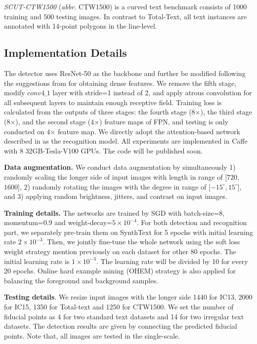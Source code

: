 \documentclass[letterpaper]{article} \usepackage{aaai20}  \usepackage{times}  \usepackage{helvet} \usepackage{courier}  \usepackage[hyphens]{url}  \usepackage{graphicx} \urlstyle{rm} \def\UrlFont{\rm}  \usepackage{graphicx}  \frenchspacing  \setlength{\pdfpagewidth}{8.5in}  \setlength{\pdfpageheight}{11in}  \usepackage{amsmath}
\begin{document}
\emph{SCUT-CTW1500} \cite{liu2019curved} (\emph{abbr.} CTW1500) is a curved text benchmark consists of 1000 training and 500 testing images.
In contrast to Total-Text, all text instances are annotated with 14-point polygons in the line-level.

\subsection{Implementation Details}

The detector uses ResNet-50 as the backbone and further be modified following the suggestions from \cite{huang2017speed} for obtaining dense features.
We remove the fifth stage, modify $conv4\_1$ layer with stride=1 instead of 2, and apply atrous convolution for all subsequent layers to maintain enough receptive field.
Training loss is calculated from the outputs of three stages: the fourth stage ($8$$\times$), the third stage ($8$$\times$), and the second stage ($4$$\times$) feature maps of FPN, and testing is only conducted on $4$$\times$ feature map.
We directly adopt the attention-based network described in \cite{cheng2017focus} as the recognition model.
All experiments are implemented in Caffe with 8 32GB-Tesla-V100 GPUs. The code will be published soon.


\textbf{Data augmentation.}
We conduct data augmentation by simultaneously 1) randomly scaling the longer side of input images with length in range of [$720$, $1600$],  2) randomly rotating the images with the degree in range of [$-15^\circ, 15^\circ]$, and 3) applying random brightness, jitters, and contrast on input images.

\textbf{Training details.}
The networks are trained by SGD with batch-size=8, momentum=0.9 and weight-decay=$5\times 10^{-4}$. For both detection and recognition part, we separately pre-train them on SynthText for 5 epochs with initial learning rate $2\times 10^{-3}$. Then, we jointly fine-tune the whole network using the soft loss weight strategy mention previously on each dataset for other 80 epochs. The initial learning rate is  $1\times 10^{-3}$. The learning rate will be divided by 10 for every 20 epochs.
Online hard example mining (OHEM) \cite{shrivastava2016training} strategy is also applied for balancing the foreground and background samples.

\textbf{Testing details}.
We resize input images with the longer side 1440 for IC13, 2000 for IC15,  1350 for Total-text and 1250 for CTW1500.  We set the number of fiducial points as 4 for two standard text datasets and 14 for two irregular text datasets. The detection results are given by connecting the predicted fiducial points.
Note that, all images are tested in the single-scale.
\end{document}
